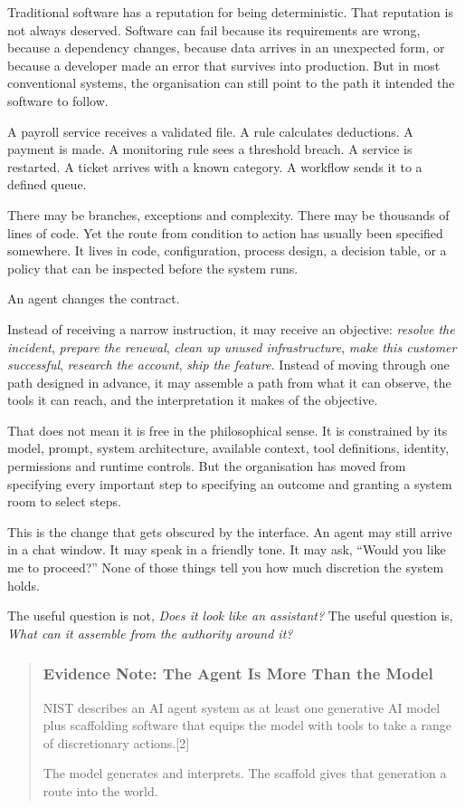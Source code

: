 Traditional software has a reputation for being deterministic. That
reputation is not always deserved. Software can fail because its
requirements are wrong, because a dependency changes, because data
arrives in an unexpected form, or because a developer made an error that
survives into production. But in most conventional systems, the
organisation can still point to the path it intended the software to
follow.

A payroll service receives a validated file. A rule calculates
deductions. A payment is made. A monitoring rule sees a threshold
breach. A service is restarted. A ticket arrives with a known category.
A workflow sends it to a defined queue.

There may be branches, exceptions and complexity. There may be thousands
of lines of code. Yet the route from condition to action has usually
been specified somewhere. It lives in code, configuration, process
design, a decision table, or a policy that can be inspected before the
system runs.

An agent changes the contract.

Instead of receiving a narrow instruction, it may receive an objective:
\emph{resolve the incident}, \emph{prepare the renewal}, \emph{clean up
unused infrastructure}, \emph{make this customer successful},
\emph{research the account}, \emph{ship the feature}. Instead of moving
through one path designed in advance, it may assemble a path from what
it can observe, the tools it can reach, and the interpretation it makes
of the objective.

That does not mean it is free in the philosophical sense. It is
constrained by its model, prompt, system architecture, available
context, tool definitions, identity, permissions and runtime controls.
But the organisation has moved from specifying every important step to
specifying an outcome and granting a system room to select steps.

This is the change that gets obscured by the interface. An agent may
still arrive in a chat window. It may speak in a friendly tone. It may
ask, ``Would you like me to proceed?'' None of those things tell you how
much discretion the system holds.

The useful question is not, \emph{Does it look like an assistant?} The
useful question is, \emph{What can it assemble from the authority around
it?}

\begin{quote}
\subsubsection{Evidence Note: The Agent Is More Than the
Model}\label{evidence-note-the-agent-is-more-than-the-model}

NIST describes an AI agent system as at least one generative AI model
plus scaffolding software that equips the model with tools to take a
range of discretionary actions.{[}2{]}

The model generates and interprets. The scaffold gives that generation a
route into the world.
\end{quote}


